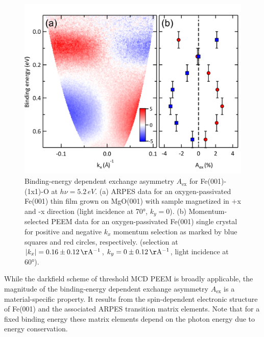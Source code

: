 \documentclass[prl,twocolumn,floatfix,superscriptaddress]{revtex4-2}
\begin{document}
\begin{figure}
    \centering
    \includegraphics[width = 0.9\columnwidth]{FePaperFigARPES.pdf}
    \caption{Binding-energy dependent exchange asymmetry $A_{\mathrm{ex}}$ for Fe(001)-(1x1)-O at $h\nu = 5.2\,eV$. (a) ARPES data for an oxygen-passivated Fe(001) thin film grown on MgO(001) with sample magnetized in +x and -x direction (light incidence at 70°, $k_y = 0$). (b) Momentum-selected PEEM data for an oxygen-passivated Fe(001) single crystal for positive and negative $k_x$ momentum selection as marked by blue squares and red circles, respectively. (selection at $|k_x| = \unit[0.16\pm0.12]{\AA^{-1}}$, $k_y = \unit[0\pm0.12]{\AA^{-1}}$, light incidence at 60°). 
    }
    \label{fig:AexContrast}
\end{figure}

While the darkfield scheme of threshold MCD PEEM is broadly applicable, the magnitude of the binding-energy dependent exchange asymmetry $A_{\mathrm{ex}}$ is a material-specific property. It results from the spin-dependent electronic structure of Fe(001) and the associated ARPES  transition matrix elements. Note that for a fixed binding energy these matrix elements depend on the photon energy due to energy conservation.
\end{document}
